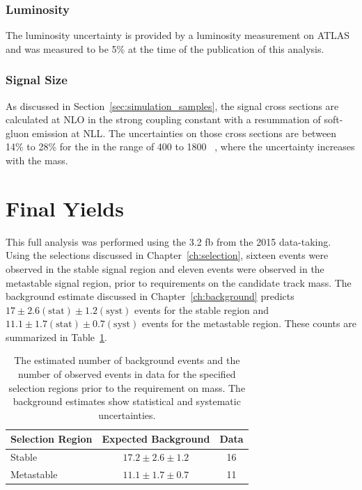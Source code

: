 \subsubsection{Luminosity}
The luminosity uncertainty is provided by a luminosity measurement on \ac{ATLAS} and was measured to be 5\% at the time of the publication of this analysis.

\subsubsection{Signal Size}
As discussed in Section~\ref{sec:simulation_samples}, the signal cross sections are calculated at \ac{NLO} in the strong coupling constant with a resummation of soft-gluon emission at \ac{NLL}. 
The uncertainties on those cross sections are between 14\% to 28\% for the \rhadrons in the range of 400 to 1800 \GeV~\cite{Mackeprang:2006gx, Mackeprang:2009ad}, where the uncertainty increases with the mass.


\section{Final Yields}
This full analysis was performed using the 3.2 fb from the 2015 data-taking.
Using the selections discussed in Chapter~\ref{ch:selection}, sixteen events were observed in the stable signal region and eleven events were observed in the metastable signal region, prior to requirements on the candidate track mass.
The background estimate discussed in Chapter~\ref{ch:background} predicts $17 \pm 2.6 (\mathrm{stat}) \pm 1.2 (\mathrm{syst})$ events for the stable region and $11.1 \pm 1.7 (\mathrm{stat}) \pm 0.7 (\mathrm{syst})$ events for the metastable region. 
These counts are summarized in Table~\ref{tab:yields}.

\begin{table}
  \begin{center}
  \begin{tabular}{lcc}
  \hline
  Selection Region & Expected Background & Data \\
  \hline
  Stable     & $17.2 \pm 2.6 \pm 1.2$ & 16 \\
  Metastable & $11.1 \pm 1.7 \pm 0.7$ & 11 \\
  \hline
  \end{tabular}
  \end{center}
  \caption{The estimated number of background events and the number of observed events in data for the specified selection regions prior to the requirement on mass. The background estimates show statistical and systematic uncertainties.}
  \label{tab:yields}
\end{table}

